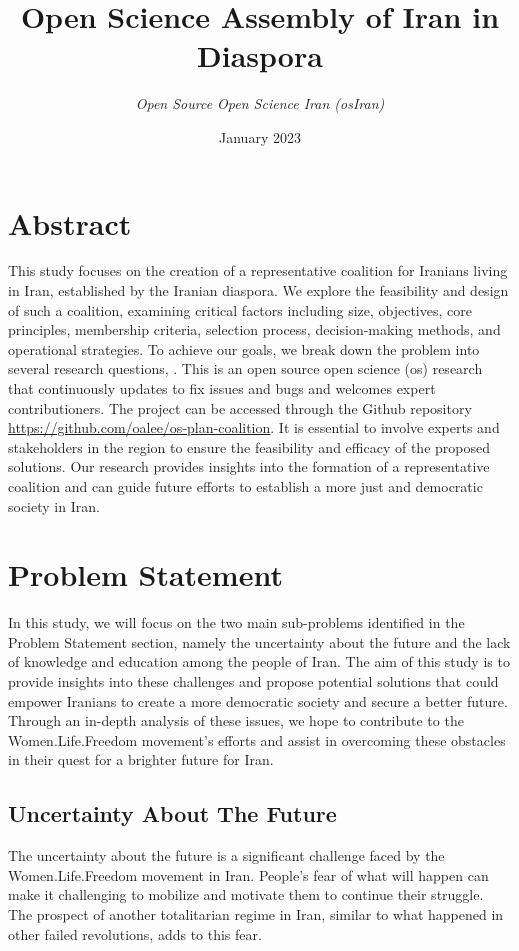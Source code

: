 \documentclass{IEEEtran}
\title{ \Huge \textbf{Open Science Assembly of Iran in Diaspora} \\[0.5cm]}
\author{

\textit{Open Source Open Science Iran (osIran)} \\
}
\date{January 2023}
\newcommand{\note}[1]{\todo[inline]{#1}}
\begin{document}
\maketitle




\section{Abstract}
This study focuses on the creation of a representative coalition for Iranians living in Iran, established by the Iranian diaspora.
We explore the feasibility and design of such a coalition, examining critical factors including size, objectives, core principles, membership criteria, selection process, decision-making methods, and operational strategies.
To achieve our goals, we break down the problem into several research questions, .
This is an open source open science (os) research that continuously updates to fix issues and bugs and welcomes expert contributioners.
The project can be accessed through the Github repository \url{https://github.com/oalee/os-plan-coalition}. 
It is essential to involve experts and stakeholders in the region to ensure the feasibility and efficacy of the proposed solutions. 
Our research provides insights into the formation of a representative coalition and can guide future efforts to establish a more just and democratic society in Iran.




\section{Problem Statement}

In this study, we will focus on the two main sub-problems identified in the Problem Statement section, namely the uncertainty about the future and the lack of knowledge and education among the people of Iran. The aim of this study is to provide insights into these challenges and propose potential solutions that could empower Iranians to create a more democratic society and secure a better future. Through an in-depth analysis of these issues, we hope to contribute to the Women.Life.Freedom movement's efforts and assist in overcoming these obstacles in their quest for a brighter future for Iran.



\subsection{Uncertainty About The Future}
The uncertainty about the future is a significant challenge faced by the Women.Life.Freedom movement in Iran. 
People's fear of what will happen can make it challenging to mobilize and motivate them to continue their struggle.
The prospect of another totalitarian regime in Iran, similar to what happened in other failed revolutions, adds to this fear.
\end{document}
